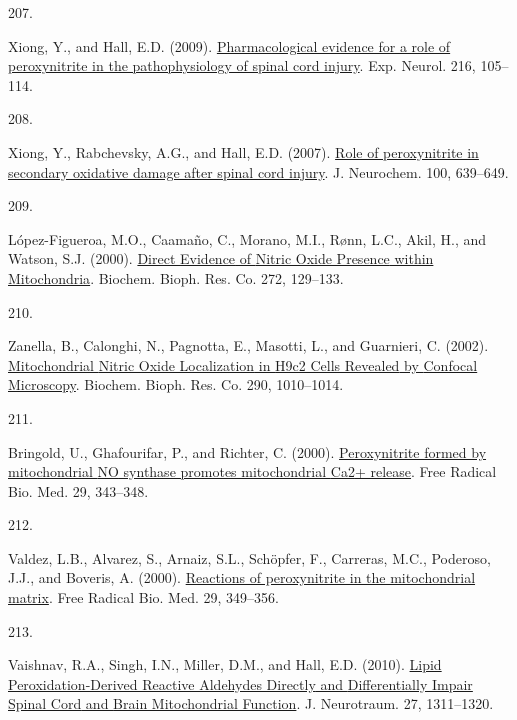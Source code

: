 \documentclass[
]{article}
\newlength{\cslhangindent}
\newlength{\csllabelwidth}
\newlength{\cslentryspacingunit} %
\newenvironment{CSLReferences}[2] %
 {%
  \setlength{\parindent}{0pt}
  \ifodd #1
  \let\oldpar\par
  \def\par{\hangindent=\cslhangindent\oldpar}
  \fi
  \setlength{\parskip}{#2\cslentryspacingunit}
 }%
 {}
\newcommand{\CSLLeftMargin}[1]{\parbox[t]{\csllabelwidth}{#1}}
\newcommand{\CSLRightInline}[1]{\parbox[t]{\linewidth - \csllabelwidth}{#1}\break}
\begin{document}
\begin{CSLReferences}{0}{0}
\leavevmode{}%
\CSLLeftMargin{207. }
\CSLRightInline{Xiong, Y., and Hall, E.D. (2009). \href{https://doi.org/10.1016/j.expneurol.2008.11.025}{Pharmacological evidence for a role of peroxynitrite in the pathophysiology of spinal cord injury}. Exp. Neurol. 216, 105--114.}

\leavevmode{}%
\CSLLeftMargin{208. }
\CSLRightInline{Xiong, Y., Rabchevsky, A.G., and Hall, E.D. (2007). \href{https://doi.org/10.1111/j.1471-4159.2006.04312.x}{Role of peroxynitrite in secondary oxidative damage after spinal cord injury}. J. Neurochem. 100, 639--649.}

\leavevmode{}%
\CSLLeftMargin{209. }
\CSLRightInline{López-Figueroa, M.O., Caamaño, C., Morano, M.I., Rønn, L.C., Akil, H., and Watson, S.J. (2000). \href{https://doi.org/10.1006/bbrc.2000.2748}{Direct {Evidence} of {Nitric Oxide Presence} within {Mitochondria}}. Biochem. Bioph. Res. Co. 272, 129--133.}

\leavevmode{}%
\CSLLeftMargin{210. }
\CSLRightInline{Zanella, B., Calonghi, N., Pagnotta, E., Masotti, L., and Guarnieri, C. (2002). \href{https://doi.org/10.1006/bbrc.2001.6284}{Mitochondrial {Nitric Oxide Localization} in {H9c2 Cells Revealed} by {Confocal Microscopy}}. Biochem. Bioph. Res. Co. 290, 1010--1014.}

\leavevmode{}%
\CSLLeftMargin{211. }
\CSLRightInline{Bringold, U., Ghafourifar, P., and Richter, C. (2000). \href{https://doi.org/10.1016/S0891-5849(00)00318-X}{Peroxynitrite formed by mitochondrial {NO} synthase promotes mitochondrial {Ca2}+ release}. Free Radical Bio. Med. 29, 343--348.}

\leavevmode{}%
\CSLLeftMargin{212. }
\CSLRightInline{Valdez, L.B., Alvarez, S., Arnaiz, S.L., Schöpfer, F., Carreras, M.C., Poderoso, J.J., and Boveris, A. (2000). \href{https://doi.org/10.1016/S0891-5849(00)00301-4}{Reactions of peroxynitrite in the mitochondrial matrix}. Free Radical Bio. Med. 29, 349--356.}

\leavevmode{}%
\CSLLeftMargin{213. }
\CSLRightInline{Vaishnav, R.A., Singh, I.N., Miller, D.M., and Hall, E.D. (2010). \href{https://doi.org/10.1089/neu.2009.1172}{Lipid {Peroxidation-Derived Reactive Aldehydes Directly} and {Differentially Impair Spinal Cord} and {Brain Mitochondrial Function}}. J. Neurotraum. 27, 1311--1320.}


\end{CSLReferences}
\end{document}

